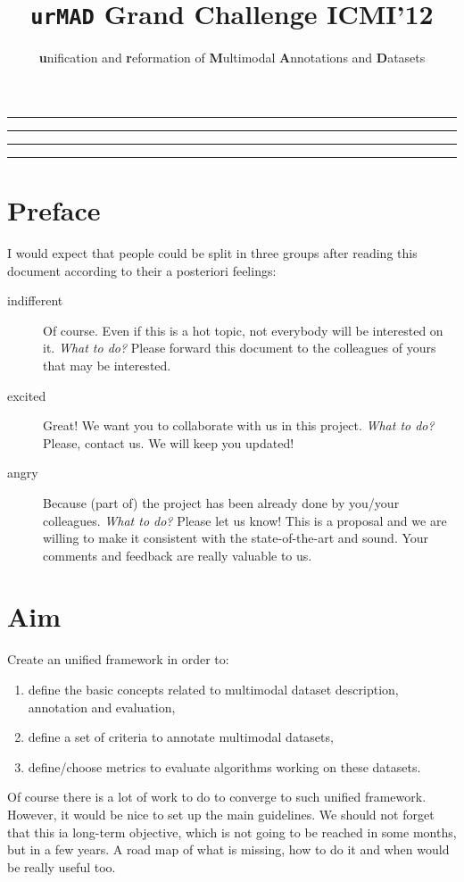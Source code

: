 \documentclass{article}
\title{\texttt{urMAD}\hspace{0.5cm} Grand Challenge ICMI'12}
\author{\textbf{u}nification and \textbf{r}eformation of
 \textbf{M}ultimodal \textbf{A}nnotations and \textbf{D}atasets}
\date{}
\begin{document}
 \maketitle
 \hrule
 \vspace{0.1cm}
 \hrule
 \tableofcontents
 \vspace{0.5cm}
 \hrule
 \vspace{0.1cm}
 \hrule

 \section{Preface}
 \label{sec:preface}
I would expect that people could be split in three groups after reading this document according to their a posteriori
feelings:
\begin{description}
 \item [indifferent] Of course. Even if this is a hot topic, not everybody will be interested on it. \textit{What to
do?} Please forward this document to the colleagues of yours that may be interested.
 \item [excited] Great! We want you to collaborate with us in this project. \textit{What to do?} Please, contact us. We
will keep you updated!
 \item [angry] Because (part of) the project has been already done by you/your colleagues. \textit{What to do?} Please
let us know! This is a proposal and we are willing to make it consistent with the state-of-the-art and sound. Your
comments and feedback are really valuable to us.
\end{description}


 \section{Aim}
  Create an unified framework in order to:
 \begin{enumerate}
  \item define the basic concepts related to multimodal dataset description, annotation and evaluation,
  \item define a set of criteria to annotate multimodal datasets,
  \item define/choose metrics to evaluate algorithms working on these datasets.
 \end{enumerate}
Of course there is a lot of work to do to converge to such unified framework. However, it would be nice to set up the
main guidelines. We should not forget that this ia long-term objective, which is not going to be reached in some
months, but in a few years. A road map of what is missing, how to do it and when would be really useful too.
\end{document}
